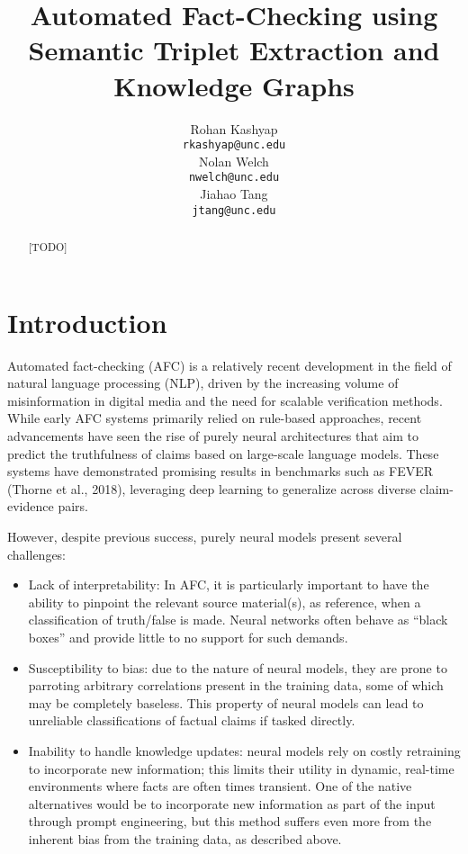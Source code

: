 \documentclass[11pt]{article}
\title{Automated Fact-Checking using Semantic Triplet Extraction and Knowledge Graphs}
\author{
  Rohan Kashyap \\
  \texttt{rkashyap@unc.edu} \\\And
  Nolan Welch \\
  \texttt{nwelch@unc.edu} \\\And
  Jiahao Tang \\
  \texttt{jtang@unc.edu}
}
\begin{document}
\maketitle
\begin{abstract}
[TODO]
\end{abstract}

\section{Introduction}
Automated fact-checking (AFC) is a relatively recent development in the field of natural language processing (NLP), driven by the increasing volume of misinformation in digital media and the need for scalable verification methods. While early AFC systems primarily relied on rule-based approaches, recent advancements have seen the rise of purely neural architectures that aim to predict the truthfulness of claims based on large-scale language models. These systems have demonstrated promising results in benchmarks such as FEVER (Thorne et al., 2018)\cite{}, leveraging deep learning to generalize across diverse claim-evidence pairs.

However, despite previous success, purely neural models present several challenges:
\begin{itemize}
    \item Lack of interpretability: In AFC, it is particularly important to have the ability to pinpoint the relevant source material(s), as reference, when a classification of truth/false is made. Neural networks often behave as “black boxes” and provide little to no support for such demands. 
    \item Susceptibility to bias: due to the nature of neural models, they are prone to parroting arbitrary correlations present in the training data, some of which may be completely baseless. This property of neural models can lead to unreliable classifications of factual claims if tasked directly. 
    \item Inability to handle knowledge updates: neural models rely on costly retraining to incorporate new information; this limits their utility in dynamic, real-time environments where facts are often times transient. One of the native alternatives would be to incorporate new information as part of the input through prompt engineering, but this method suffers even more from the inherent bias from the training data, as described above. 
\end{itemize}
\end{document}
